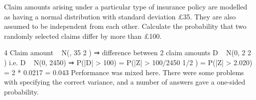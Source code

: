 \documentclass[a4paper,12pt]{article}
\begin{document}

Claim amounts arising under a particular type of insurance policy are modelled as
having a normal distribution with standard deviation £35. They are also assumed to be
independent from each other.
Calculate the probability that two randomly selected claims differ by more than £100.

\newpage

4
Claim amount ~ N(\mu, 35 2 ) ⇒ difference between 2 claim amounts D ~ N(0, 2 2 )
i.e. D ~ N(0, 2450)
⇒ P(|D| > 100) = P(|Z| > 100/2450 1/2 ) = P(|Z| > 2.020) = 2 * 0.0217 = 0.043
Performance was mixed here. There were some problems with specifying the correct
variance, and a number of answers gave a one-sided probability.
\end{document}
